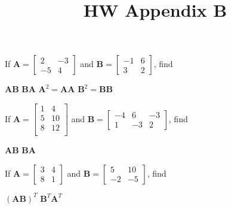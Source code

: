 \documentclass[chapter=2,section=1]{math252homework}
\title{HW Appendix B}
\begin{document}
\begin{problems}[start=3]
	\problem If $\mathbf{A}=\left[ \begin{array}{cc}
		2 & -3\\
		-5 & 4
	\end{array} \right]$ and $\mathbf{B}=\left[ \begin{array}{cc}
		-1 & 6\\
		3 & 2
	\end{array} \right]$, find
	\begin{problems}
		\subproblem $\mathbf{A}\mathbf{B}$						%
		\subproblem $\mathbf{B}\mathbf{A}$						%
		\subproblem $\mathbf{A}^{2}=\mathbf{A}\mathbf{A}$		%
		\subproblem $\mathbf{B}^{2}=\mathbf{B}\mathbf{B}$		%
	\end{problems}
	\problem If $\mathbf{A}=\left[ \begin{array}{cc}
		1 & 4\\
		5 & 10\\
		8 & 12\\
	\end{array} \right]$ and $\mathbf{B}=\left[ \begin{array}{ccc}
		-4 & 6 & -3\\
		1 & -3 & 2
	\end{array} \right]$, find
	\begin{problems}
		\subproblem $\mathbf{A}\mathbf{B}$						%
		\subproblem $\mathbf{B}\mathbf{A}$						%
	\end{problems}
	\setcounter{problemsi}{8}
	\problem If $\mathbf{A}=\left[ \begin{array}{cc}
		3 & 4\\
		8 & 1
	\end{array} \right]$ and $\mathbf{B}=\left[ \begin{array}{cc}
		5 & 10\\
		-2 & -5
	\end{array} \right]$, find
	\begin{problems}
		\subproblem $(\mathbf{A}\mathbf{B})^{T}$						%
		\subproblem $\mathbf{B}^{T}\mathbf{A}^{T}$						%
	\end{problems}
\end{problems}
\end{document}
